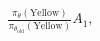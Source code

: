 \documentclass[preview]{standalone}
\begin{document}
\begin{align*}
\frac{\pi_\theta(\text{Yellow})}{\pi_{\theta_{\text{old}}}(\text{Yellow})} A_1,
\end{align*}
\end{document}
